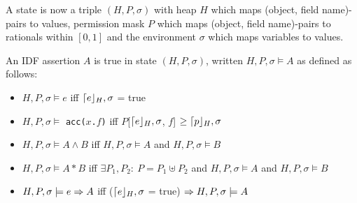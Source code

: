 \begin{mytitle}[State] A state is now a triple $(H, P, \sigma)$ with heap $H$ which maps (object, field name)-pairs to values, permission mask $P$ which maps (object, field name)-pairs to rationals within $[0,1]$ and the environment $\sigma$ which maps variables to values.
\end{mytitle}
\begin{mytitle} An IDF assertion $A$ is true in state $(H, P, \sigma)$, written $H, P, \sigma \models A$ as defined as follows:
\begin{itemize}
    \item $H, P, \sigma \models e$ iff $\lceil e\rfloor_H, \sigma$ = true
    \item $H, P, \sigma \models$ \texttt{acc($x$.$f$)} iff $P$[$\lceil e\rfloor_H, \sigma$, $f$] $\ge \lceil p\rfloor_H, \sigma$
    \item $H, P, \sigma \models A\land B$ iff $H, P, \sigma \models A$ and $H, P, \sigma \models B$
    \item $H, P, \sigma \models A*B$ iff $\exists P_1, P_2:\ P = P_1 \uplus P_2$ and $H, P, \sigma \models A$ and $H, P, \sigma \models B$
    \item $H, P, \sigma \models e\Rightarrow A$ iff ($\lceil e\rfloor_H, \sigma$ = true) $\Rightarrow H, P, \sigma \models A$
\end{itemize}
\end{mytitle}

